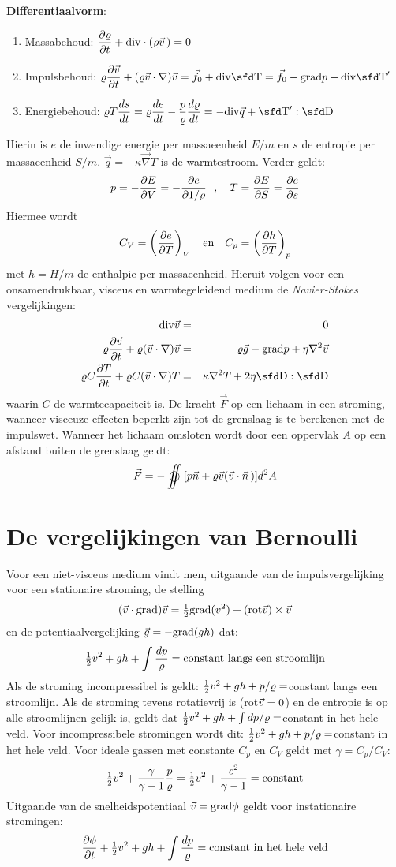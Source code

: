 {\large\bf Differentiaalvorm}:
\begin{enumerate}
\item Massabehoud: $\displaystyle\frac{\partial \varrho}{\partial t}+{\rm div}\cdot(\varrho\vec{v}\,)=0$
\item Impulsbehoud: $\displaystyle\varrho\Q{\vv}{t}+(\varrho\vv\cdot\nabla)\vv=\vec{f}_0+{\rm div}\TT=\vec{f}_0-{\rm grad}p+{\rm div}\TT'$
\item Energiebehoud: $\displaystyle\varrho T\frac{ds}{dt}=\varrho\frac{de}{dt}-\frac{p}{\varrho}\frac{d\varrho}{dt}=-{\rm div}\vec{q}+\TT':\DD$
\end{enumerate}
Hierin is $e$ de inwendige energie per massaeenheid $E/m$ en $s$ de entropie
per massaeenheid $S/m$. $\vec{q}=-\kappa\vec{\nabla}T$ is de warmtestroom.
Verder geldt:
\[
p=-\frac{\partial E}{\partial V}=-\frac{\partial e}{\partial 1/\varrho}~~,~~~T=\frac{\partial E}{\partial S}=\frac{\partial e}{\partial s}
\]
Hiermee wordt
\[
C_V=\left(\frac{\partial e}{\partial T}\right)_{V}~~~\mbox{en}~~~C_p=\left(\frac{\partial h}{\partial T}\right)_{p}
\]
met $h=H/m$ de enthalpie per massaeenheid.
\npar
Hieruit volgen voor een onsamendrukbaar, visceus en warmtegeleidend medium
de {\it Navier-Stokes} vergelijkingen:
\begin{eqnarray*}
{\rm div}\vv&=&0\\
\varrho\Q{\vv}{t}+\varrho(\vv\cdot\nabla)\vv&=&\varrho\vec{g}-{\rm grad}p+\eta\nabla^2\vv\\
\varrho C\Q{T}{t}+\varrho C(\vv\cdot\nabla)T&=&\kappa\nabla^2 T+2\eta\DD:\DD
\end{eqnarray*}
waarin $C$ de warmtecapaciteit is. De kracht $\vec{F}$ op een lichaam in een
stroming, wanneer visceuze effecten beperkt zijn tot de grenslaag is te
berekenen met de impulswet. Wanneer het lichaam omsloten wordt door een
oppervlak $A$ op een afstand buiten de grenslaag geldt:
\[
\vec{F}=-\oiint[p\vec{n}+\varrho\vv(\vv\cdot\vvec{n})]d^2A
\]

\section{De vergelijkingen van Bernoulli}
Voor een niet-visceus medium vindt men, uitgaande van de impulsvergelijking
voor een stationaire stroming, de stelling
\[
(\vec{v}\cdot{\rm grad})\vec{v}=\mbox{$\frac{1}{2}$}{\rm grad}(v^2)+({\rm rot}\vec{v})\times\vec{v}
\]
en de potentiaalvergelijking $\vec{g}=-{\rm grad}(gh)$ dat:
\[
\mbox{$\frac{1}{2}$} v^2+gh+\int\frac{dp}{\varrho}=\mbox{constant langs een stroomlijn}
\]
Als de stroming incompressibel is geldt: $\mbox{$\frac{1}{2}$} v^2+gh+p/\varrho=$constant
langs een stroomlijn. Als de stroming tevens rotatievrij is (rot$\vec{v}=0$)
en de entropie is op alle stroomlijnen gelijk is, geldt dat
$\mbox{$\frac{1}{2}$} v^2+gh+\int dp/\varrho=$constant in het hele veld. Voor incompressibele
stromingen wordt dit: $\mbox{$\frac{1}{2}$} v^2+gh+p/\varrho=$constant in het hele veld.
Voor ideale gassen met constante $C_p$ en $C_V$ geldt met $\gamma=C_p/C_V$:
\[
\mbox{$\frac{1}{2}$} v^2+\frac{\gamma}{\gamma-1}\frac{p}{\varrho}=\mbox{$\frac{1}{2}$} v^2+\frac{c^2}{\gamma-1}=\mbox{constant}
\]
Uitgaande van de snelheidspotentiaal $\vec{v}={\rm grad}\phi$ geldt voor
instationaire stromingen:
\[
\frac{\partial \phi}{\partial t}+\mbox{$\frac{1}{2}$} v^2+gh+\int\frac{dp}{\varrho}=\mbox{constant in het hele veld}
\]

